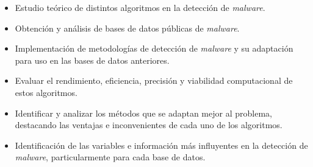 \begin{itemize}
	\item Estudio teórico de distintos algoritmos en la detección de \textit{malware}.
	\item Obtención y análisis de bases de datos públicas de \textit{malware}.
	\item Implementación de metodologías de detección de \textit{malware} y su adaptación para uso en las bases de datos anteriores.
	\item Evaluar el rendimiento, eficiencia, precisión y viabilidad computacional de estos algoritmos.
	\item Identificar y analizar los métodos que se adaptan mejor al problema, destacando las ventajas e inconvenientes de cada uno de los algoritmos.
	\item Identificación de las variables e información más influyentes en la detección de \textit{malware}, particularmente para cada base de datos.
\end{itemize}

